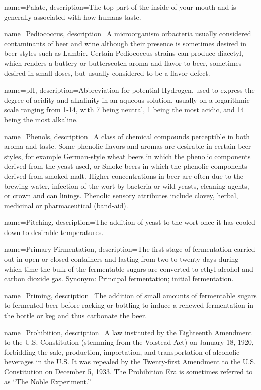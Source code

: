 {
  name={Palate},
  description={The top part of the inside of your mouth and is generally associated with how humans taste.}
  }

{
  name={Pediococcus},
  description={A microorganism orbacteria usually considered contaminants of beer and wine although their presence is sometimes desired in beer styles such as Lambic. Certain Pediococcus strains can produce diacetyl, which renders a buttery or butterscotch aroma and flavor to beer, sometimes desired in small doses, but usually considered to be a flavor defect.}
  }

{
  name={pH},
  description={Abbreviation for potential Hydrogen, used to express the degree of acidity and alkalinity in an aqueous solution, usually on a logarithmic scale ranging from 1-14, with 7 being neutral, 1 being the most acidic, and 14 being the most alkaline.}
  }

{
  name={Phenols},
  description={A class of chemical compounds perceptible in both aroma and taste. Some phenolic flavors and aromas are desirable in certain beer styles, for example German-style wheat beers in which the phenolic components derived from the yeast used, or Smoke beers in which the phenolic components derived from smoked malt. Higher concentrations in beer are often due to the brewing water, infection of the wort by bacteria or wild yeasts, cleaning agents, or crown and can linings. Phenolic sensory attributes include clovey, herbal, medicinal or pharmaceutical (band-aid).}
  }

{
  name={Pitching},
  description={The addition of yeast to the wort once it has cooled down to desirable temperatures.}
  }

{
  name={Primary Firmentation},
  description={The first stage of fermentation carried out in open or closed containers and lasting from two to twenty days during which time the bulk of the fermentable sugars are converted to ethyl alcohol and carbon dioxide gas. Synonym: Principal fermentation; initial fermentation.}
  }

{
  name={Priming},
  description={The addition of small amounts of fermentable sugars to fermented beer before racking or bottling to induce a renewed fermentation in the bottle or keg and thus carbonate the beer.}
  }

{
  name={Prohibition},
  description={A law instituted by the Eighteenth Amendment to the U.S. Constitution (stemming from the Volstead Act) on January 18, 1920, forbidding the sale, production, importation, and transportation of alcoholic beverages in the U.S. It was repealed by the Twenty-first Amendment to the U.S. Constitution on December 5, 1933. The Prohibition Era is sometimes referred to as ``The Noble Experiment.''}
  }

